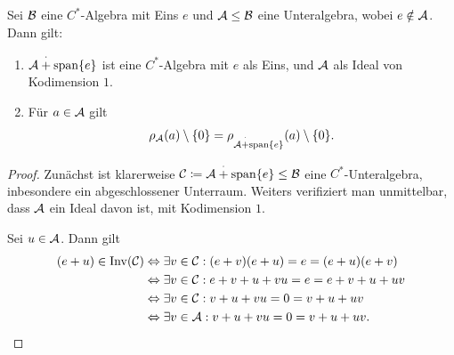 \begin{lemma}
    Sei $\mathcal{B}$ eine $C^*$-Algebra mit Eins $e$ und $\mathcal{A} \leq \mathcal{B}$ eine Unteralgebra, wobei $e \notin \mathcal{A}$. Dann gilt:
    \begin{enumerate}
        \item $\mathcal{A} \overset{\cdot}{+} \mathrm{span} \{ e \}$ ist eine $C^*$-Algebra mit $e$ als Eins, und $\mathcal{A}$ als Ideal von Kodimension $1$.
        \item Für $a \in \mathcal{A}$ gilt
        \[
            \rho_{\mathcal{A}} (a) \setminus \{0\}
            =
            \rho_{\mathcal{A} \overset{\cdot}{+} \mathrm{span} \{ e \}} (a) \setminus \{0\}.
        \]
    \end{enumerate}
\end{lemma}

\begin{proof}
    Zunächst ist klarerweise $\mathcal{C} \coloneq \mathcal{A} \overset{\cdot}{+} \mathrm{span} \{ e \} \leq \mathcal{B}$ eine $C^*$-Unteralgebra, inbesondere ein abgeschlossener Unterraum. Weiters verifiziert man unmittelbar, dass $\mathcal{A}$ ein Ideal davon ist, mit Kodimension $1$.

    Sei $u \in \mathcal{A}$. Dann gilt
    \begin{align*}
        (e + u) \in \operatorname*{Inv} (\mathcal{C})
        &\Leftrightarrow
        \exists v \in \mathcal{C} : (e + v)(e + u) = e = (e + u)(e + v)
        \\ &\Leftrightarrow
        \exists v \in \mathcal{C} : e + v + u + vu = e = e + v + u + uv
        \\ &\Leftrightarrow
        \exists v \in \mathcal{C} : v + u + vu = 0 = v + u + uv
        \\ &\Leftrightarrow
        \exists v \in \mathcal{A} : v + u + vu = 0 = v + u + uv.
    \end{align*}


\end{proof}
